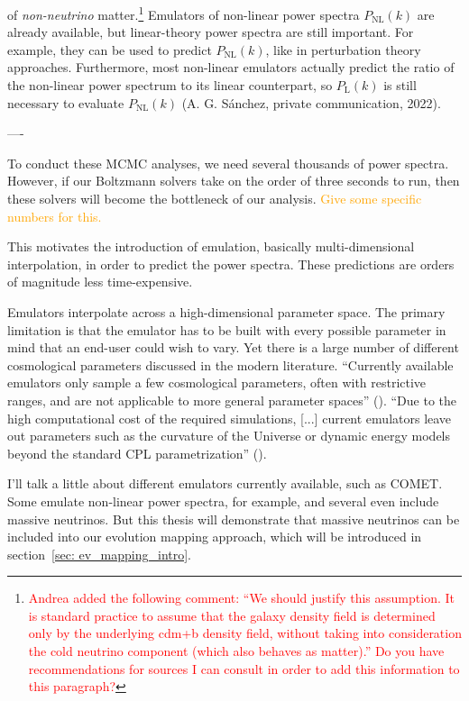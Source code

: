  of \textit{non-neutrino} 
matter.\footnote{\textcolor{red}{Andrea added the following comment: ``We 
should 
justify this assumption. It is standard practice to assume that the galaxy 
density field is determined only by the underlying cdm+b density field, 
without taking into consideration the cold neutrino component (which also 
behaves as matter).'' Do you have recommendations for sources I can consult in
order to add this information to this paragraph?}} Emulators of non-linear 
power spectra $P_\text{NL}(k)$ are 
already available, but linear-theory power spectra are still important.
For example, they can be used to predict $P_\text{NL}(k)$, like in 
perturbation theory approaches. Furthermore, most non-linear emulators
actually predict the ratio of the non-linear power spectrum to its linear
counterpart, so $P_\text{L}(k)$ is still necessary to evaluate
$P_\text{NL}(k)$ (A. G. S\'{a}nchez, private communication, 2022).

----

To conduct these MCMC analyses, we need several thousands of power spectra. However, if our Boltzmann solvers take on the order of three seconds to run, then these solvers will become the bottleneck of our analysis. \textcolor{orange}{Give some specific numbers for this.}

This motivates the introduction of emulation, basically multi-dimensional interpolation, in order to predict the power spectra. These predictions are orders of magnitude less time-expensive. 

Emulators interpolate across a high-dimensional parameter space. The primary
limitation is that the emulator has to be built with every possible parameter
in mind that an end-user could wish to vary. Yet there is a large number of
different cosmological parameters discussed in the modern literature.
``Currently available emulators only sample a few cosmological parameters,
often with restrictive ranges, and are not applicable to more general
parameter
spaces'' (). ``Due to the high computational cost of the required
simulations, [...] current emulators leave out parameters such as the
curvature
of the Universe or dynamic energy models beyond the standard CPL
parametrization'' ().

I'll talk a little about different emulators currently available, such as COMET. Some emulate non-linear power spectra, for example, and several even include massive neutrinos. But this thesis will demonstrate that massive neutrinos can be included into our evolution mapping approach, which will be introduced in section~\ref{sec: ev_mapping_intro}.

